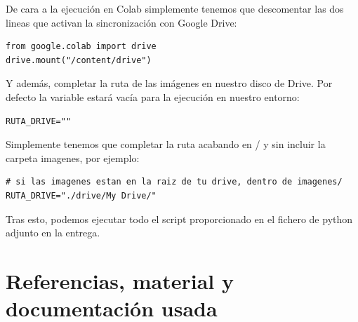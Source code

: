 \documentclass[12pt, spanish]{article}
\begin{document}
De cara a la ejecución en Colab simplemente tenemos que descomentar las dos lineas que activan la sincronización con Google Drive:

\begin{lstlisting}
from google.colab import drive
drive.mount("/content/drive")
\end{lstlisting}

Y además, completar la ruta de las imágenes en nuestro disco de Drive. Por defecto la variable estará vacía para la ejecución en nuestro entorno:

\begin{lstlisting}
RUTA_DRIVE=""
\end{lstlisting}

Simplemente tenemos que completar la ruta acabando en / y sin incluir la carpeta imagenes, por ejemplo:

\begin{lstlisting}
# si las imagenes estan en la raiz de tu drive, dentro de imagenes/
RUTA_DRIVE="./drive/My Drive/"
\end{lstlisting}

Tras esto, podemos ejecutar todo el script proporcionado en el fichero de python adjunto en la entrega.

\newpage

\section{Referencias, material y documentación usada}
\end{document}

